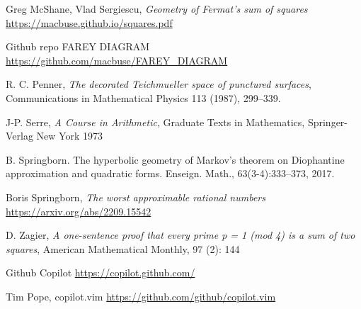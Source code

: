 \documentclass[12pt]{amsart}
\theoremstyle{plain}
\theoremstyle{definition}
\begin{document}


Greg McShane, Vlad Sergiescu,
\textit{Geometry of Fermat's sum of squares}
\url{https://macbuse.github.io/squares.pdf}

Github repo FAREY DIAGRAM \url{https://github.com/macbuse/FAREY_DIAGRAM}

R. C. Penner, 
\textit{The decorated Teichmueller space of punctured surfaces}, 
Communications in Mathematical Physics 113 (1987), 299–339.



J-P. Serre,
\textit{A Course in Arithmetic},
Graduate Texts in Mathematics,
Springer-Verlag New York
1973



B. Springborn. The hyperbolic geometry of Markov’s theorem on Diophantine
approximation and quadratic forms. Enseign. Math., 63(3-4):333–373, 2017.

Boris Springborn,
\textit{The worst approximable rational numbers}
\url{https://arxiv.org/abs/2209.15542}



D. Zagier,
 \textit{A one-sentence proof that every prime p = 1 (mod 4) is a sum of two squares}, 
 American Mathematical Monthly, 97 (2): 144

 Github Copilot \url{https://copilot.github.com/}

Tim Pope, copilot.vim \url{https://github.com/github/copilot.vim}
 

 
\end{document}
